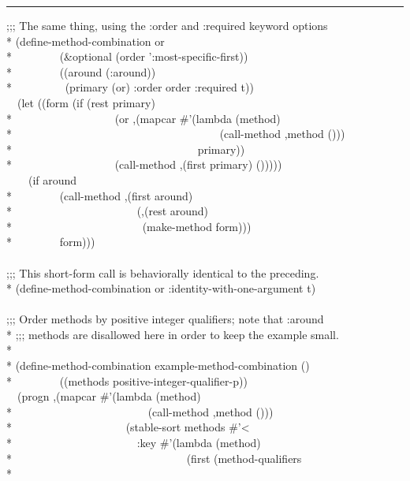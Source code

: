 \begin{defmac}
\hrule width 0pt\relax
\begin{lisp}
;;; The same thing, using the :order and :required keyword options \\*
(define-method-combination or  \\*
~~~~~~~~(\&optional (order ':most-specific-first)) \\*
~~~~~~~~((around (:around)) \\*
~~~~~~~~~(primary (or) :order order :required t)) \\
~~(let ((form (if (rest primary) \\*
~~~~~~~~~~~~~~~~~~{\Xbq}(or ,{\Xatsign}(mapcar \#'(lambda (method) \\*
~~~~~~~~~~~~~~~~~~~~~~~~~~~~~~~~~~~~~{\Xbq}(call-method ,method ())) \\*
~~~~~~~~~~~~~~~~~~~~~~~~~~~~~~~~~primary)) \\*
~~~~~~~~~~~~~~~~~~{\Xbq}(call-method ,(first primary) ())))) \\
~~~~(if around \\*
~~~~~~~~{\Xbq}(call-method ,(first around) \\*
~~~~~~~~~~~~~~~~~~~~~~(,{\Xatsign}(rest around) \\*
~~~~~~~~~~~~~~~~~~~~~~~(make-method form))) \\*
~~~~~~~~form))) \\
\\
;;; This short-form call is behaviorally identical to the preceding. \\*
(define-method-combination or :identity-with-one-argument t) \\
 \\
;;; Order methods by positive integer qualifiers; note that :around \\*
;;; methods are disallowed here in order to keep the example small. \\*
\\*
(define-method-combination example-method-combination () \\*
~~~~~~~~((methods positive-integer-qualifier-p)) \\
~~{\Xbq}(progn ,{\Xatsign}(mapcar \#'(lambda (method) \\*
~~~~~~~~~~~~~~~~~~~~~~~~{\Xbq}(call-method ,method ())) \\*
~~~~~~~~~~~~~~~~~~~~(stable-sort methods \#'< \\*
~~~~~~~~~~~~~~~~~~~~~~:key \#'(lambda (method) \\*
~~~~~~~~~~~~~~~~~~~~~~~~~~~~~~~(first (method-qualifiers \\*

\end{lisp}
\end{defmac}
